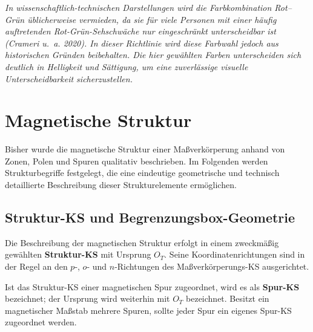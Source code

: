 \documentclass[
  ngerman,
  a4paper,
  twoside]{scrbook}
\newcounter{quartocallouttipno}
\newcommand{\quartocallouttip}[1]{\refstepcounter{quartocallouttipno}\label{#1}}
\begin{document}
\begin{tcolorbox}[enhanced jigsaw, arc=.35mm, bottomrule=.15mm, bottomtitle=1mm, breakable, colback=white, colbacktitle=quarto-callout-tip-color!10!white, colframe=quarto-callout-tip-color-frame, coltitle=black, left=2mm, leftrule=.75mm, opacityback=0, opacitybacktitle=0.6, rightrule=.15mm, title=\textcolor{quarto-callout-tip-color}{\faLightbulb}\hspace{0.5em}{Hinweis \ref*{tip-04-rot-grun}}, titlerule=0mm, toprule=.15mm, toptitle=1mm]

\quartocallouttip{tip-04-rot-grun} 

\emph{In wissenschaftlich-technischen Darstellungen wird die
Farbkombination Rot--Grün üblicherweise vermieden, da sie für viele
Personen mit einer häufig auftretenden Rot-Grün-Sehschwäche nur
eingeschränkt unterscheidbar ist (Crameri u.~a. 2020). In dieser
Richtlinie wird diese Farbwahl jedoch aus historischen Gründen
beibehalten. Die hier gewählten Farben unterscheiden sich deutlich in
Helligkeit und Sättigung, um eine zuverlässige visuelle
Unterscheidbarkeit sicherzustellen.}

\end{tcolorbox}

\section{Magnetische
Struktur}\label{sec-04-magnetische_strukturbeschreibung}

Bisher wurde die magnetische Struktur einer Maßverkörperung anhand von
Zonen, Polen und Spuren qualitativ beschrieben. Im Folgenden werden
Strukturbegriffe festgelegt, die eine eindeutige geometrische und
technisch detaillierte Beschreibung dieser Strukturelemente ermöglichen.

\subsection{Struktur-KS und
Begrenzungsbox-Geometrie}\label{sec-04-strukturKS}

Die Beschreibung der magnetischen Struktur erfolgt in einem zweckmäßig
gewählten \textbf{Struktur-KS} mit Ursprung \(O_T\). Seine
Koordinatenrichtungen sind in der Regel an den \(p\)-, \(o\)- und
\(n\)-Richtungen des Maßverkörperungs-KS ausgerichtet.

Ist das Struktur-KS einer magnetischen Spur zugeordnet, wird es als
\textbf{Spur-KS} bezeichnet; der Ursprung wird weiterhin mit \(O_T\)
bezeichnet. Besitzt ein magnetischer Maßstab mehrere Spuren, sollte
jeder Spur ein eigenes Spur-KS zugeordnet werden.
\end{document}
